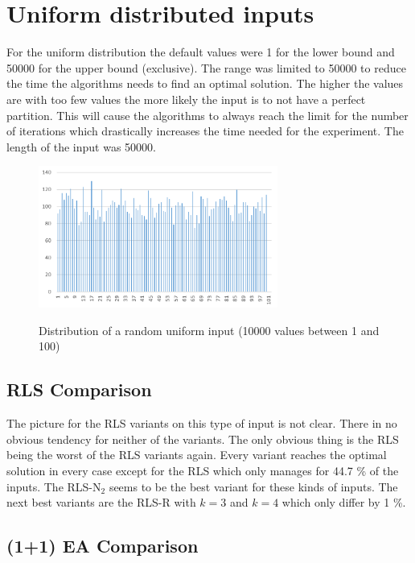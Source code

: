 \section{Uniform distributed inputs}
For the uniform distribution the default values were 1 for the lower bound and 50000 for the upper bound (exclusive).
The range was limited to 50000 to reduce the time the algorithms needs to find an optimal solution.
The higher the values are with too few values the more likely the input is to not have a perfect partition\cite{borgs2001phase}.
This will cause the algorithms to always reach the limit for the number of iterations which drastically increases the time needed for the experiment.
The length of the input was 50000.


\begin{figure}[h]
      \caption{Distribution of a random uniform input (10000 values between 1 and 100)}
      \centering
      \includegraphics[width=0.7\textwidth]{figures/images/numberGenerator/uniformDistributionMin1Max101n10000.png}\label{fig:uniDistExample}
\end{figure}
\subsection{RLS Comparison}




The picture for the RLS variants on this type of input is not clear.
There in no obvious tendency for neither of the variants.
The only obvious thing is the RLS being the worst of the RLS variants again.
Every variant reaches the optimal solution in every case except for the RLS which only manages for 44.7 \% of the inputs.
The RLS-N$_2$ seems to be the best variant for these kinds of inputs.
The next best variants are the RLS-R with $k=3$ and $k=4$ which only differ by 1 \%.

\subsection{(1+1) EA Comparison}


